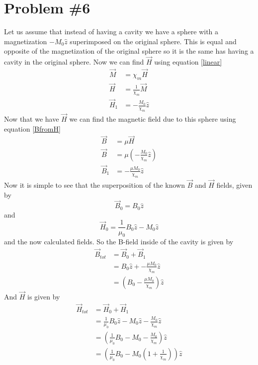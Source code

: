 \documentclass[11pt]{article}
\numberwithin{equation}{section}
\begin{document}
\section{Problem \#6}
Let us assume that instead of having a cavity we have a sphere with a magnetization $-M_0\hat{z}$ superimposed on the original sphere. This is equal and opposite of the magnetization of the original sphere so it is the same has having a cavity in the original sphere. Now we can find $\vec{H}$ using equation \ref{linear}
\begin{align*}
\vec{M} &= \chi_m \vec{H}\\
\vec{H} &= \frac{1}{\chi_m} \vec{M}\\
\vec{H}_1 &= -\frac{M_0}{\chi_m} \hat{z}
\end{align*}
Now that we have $\vec{H}$ we can find the magnetic field due to this sphere using equation \ref{BfromH}
\begin{align*}
\vec{B} &= \mu \vec{H}\\
\vec{B} &= \mu \left(-\frac{M_0}{\chi_m} \hat{z}\right)\\
\vec{B}_1 &= -\frac{\mu M_0}{\chi_m} \hat{z}
\end{align*}
Now it is simple to see that the superposition of the known $\vec{B}$ and $\vec{H}$ fields, given by
$$\vec{B}_0 = B_0\hat{z}$$
and
$$\vec{H}_0 = \frac{1}{\mu_0}B_0\hat{z} - M_0\hat{z}$$
and the now calculated fields. So the B-field inside of the cavity is given by
\begin{align*}
\vec{B}_{tot} &= \vec{B}_0 + \vec{B}_1\\
&= B_0\hat{z} + -\frac{\mu M_0}{\chi_m} \hat{z}\\
&= \left(B_0 - \frac{\mu M_0}{\chi_m}\right)\hat{z}
\end{align*}
And $\vec{H}$ is given by
\begin{align*}
\vec{H}_{tot} &= \vec{H}_0 + \vec{H}_1\\
&= \frac{1}{\mu_0}B_0\hat{z} - M_0\hat{z} - \frac{M_0}{\chi_m} \hat{z}\\
&= \left(\frac{1}{\mu_0}B_0 - M_0 - \frac{M_0}{\chi_m}\right) \hat{z}\\
&= \left(\frac{1}{\mu_0}B_0 - M_0\left(1+\frac{1}{\chi_m}\right)\right) \hat{z}
\end{align*}
\end{document}

